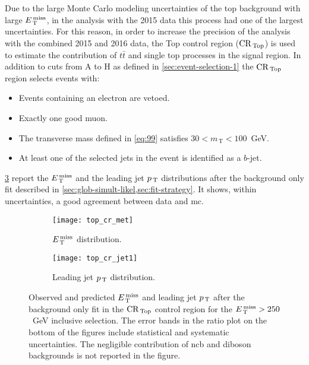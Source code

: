 Due to the large Monte Carlo modeling uncertainties of the top background with
large $E_\mathrm{\, T}^\mathrm{\, miss}$, in the analysis with the 2015 data this process had one of the
largest uncertainties. For this reason, in order to increase the precision of
the analysis with the combined 2015 and 2016 data, the Top control region
($\mathrm{CR}_\mathrm{\, Top}$) is used to estimate the contribution of $t \bar{t}$ and single top
processes in the signal region. In addition to cuts from A to H as defined in
\cref{sec:event-selection-1} the $\mathrm{CR}_\mathrm{\, Top}$ region selects events with:
\begin{itemize}
\item Events containing an electron are vetoed.
\item Exactly one good muon.
\item The transverse mass defined in \eqref{eq:99} satisfies
  $30 < m_\mathrm{\, T} < 100$~GeV.
\item At least one of the selected jets in the event is identified as a $b$-jet.
\end{itemize}
\cref{fig:top_plots} report the $E_\mathrm{\, T}^\mathrm{\, miss}$ and the leading jet $p_\mathrm{\, T}$ distributions
after the background only fit described in
\cref{sec:glob-simult-likel,sec:fit-strategy}. It shows, within uncertainties, a
good agreement between data and \gls{mc}.
\begin{figure}[!th]
  \centering
  \begin{subfigure}[t]{.48\linewidth}
    \texttt{[image: top\_cr\_met]}
    \caption{$E_\mathrm{\, T}^\mathrm{\, miss}$ distribution.}
    \label{fig:top_cr_et_miss}
  \end{subfigure}
  \begin{subfigure}[t]{.48\linewidth}
    \texttt{[image: top\_cr\_jet1]}
    \caption{Leading jet $p_\mathrm{\, T}$ distribution.}
    \label{fig:top_cr_jet1}
  \end{subfigure}
  \caption{Observed and predicted $E_\mathrm{\, T}^\mathrm{\, miss}$ and leading jet $p_\mathrm{\, T}$ after the
    background only fit in the $\mathrm{CR}_\mathrm{\, Top}$ control region for the $E_\mathrm{\, T}^\mathrm{\, miss} > 250$~GeV
    inclusive selection. The error bands in the ratio plot on the bottom of the
    figures include statistical and systematic uncertainties. The negligible
    contribution of \gls{ncb} and diboson backgrounds is not reported in the
    figure.}
  \label{fig:top_plots}
\end{figure}
